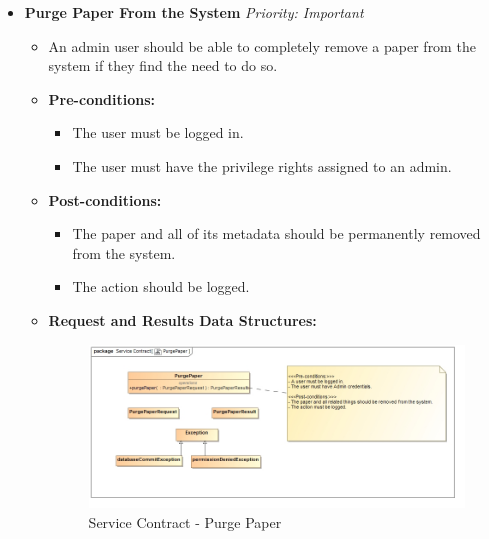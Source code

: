 \documentclass{article}
\begin{document}
\begin{itemize}
					\cleardoublepage
					\item \textbf{Purge Paper From the System} \hfill \textit{Priority: Important}
					\begin{itemize}
						\item An admin user should be able to completely remove a paper from the system if they find the need to do so.
						\item \textbf{Pre-conditions:}
						\begin{itemize}
							\item The user must be logged in.
							\item The user must have the privilege rights assigned to an admin.
						\end{itemize}
						\item \textbf{Post-conditions:}
						\begin{itemize}
							\item The paper and all of its metadata should be permanently removed from the system.
							\item The action should be logged.
						\end{itemize}
						\item \textbf{Request and Results Data Structures:}
						\begin{figure}[H]
							\includegraphics[width=\linewidth]{../Diagrams/ServiceContracts/Publication subsystem/PurgePaper.jpg}
							\caption{Service Contract - Purge Paper}
						\end{figure}
					\end{itemize}
				\end{itemize}
			\cleardoublepage
\end{document}

